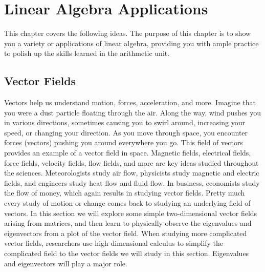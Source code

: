 
\chapter{Linear Algebra Applications}

This chapter covers the following ideas.  The purpose of this chapter is to show you a variety or applications of linear algebra, providing you with ample practice to polish up the skills learned in the arithmetic unit.  






\section{Vector Fields}



Vectors help us understand motion, forces, acceleration, and more. Imagine that you were a dust particle floating through the air.  Along the way, wind pushes you in various directions, sometimes causing you to swirl around, increasing your speed, or changing your direction. As you move through space, you encounter forces (vectors) pushing you around everywhere you go. This field of vectors provides an example of a vector field in space.  Magnetic fields, electrical fields, force fields, velocity fields, flow fields, and more are key ideas studied throughout the sciences. Meteorologists study air flow, physicists study magnetic and electric fields, and engineers study heat flow and fluid flow. In business, economists study the flow of money, which again results in studying vector fields. Pretty much every study of motion or change comes back to studying an underlying field of vectors.  In this section we will explore some simple two-dimensional vector fields arising from matrices, and then learn to physically observe the eigenvalues and eigenvectors from a plot of the vector field.  When studying more complicated vector fields, researchers use high dimensional calculus to simplify the complicated field to the vector fields we will study in this section. Eigenvalues and eigenvectors will play a major role.

